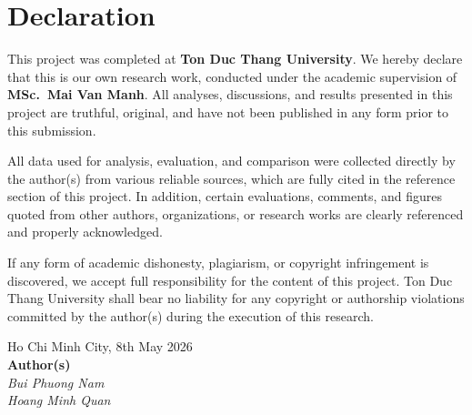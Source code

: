 \chapter*{Declaration}


This project was completed at \textbf{Ton Duc Thang University}.  
We hereby declare that this is our own research work, conducted under the academic supervision of \textbf{MSc.~Mai Van Manh}.  
All analyses, discussions, and results presented in this project are truthful, original, and have not been published in any form prior to this submission.

All data used for analysis, evaluation, and comparison were collected directly by the author(s) from various reliable sources, which are fully cited in the reference section of this project. In addition, certain evaluations, comments, and figures quoted from other authors, organizations, or research works are clearly referenced and properly acknowledged.

If any form of academic dishonesty, plagiarism, or copyright infringement is discovered, we accept full responsibility for the content of this project. Ton Duc Thang University shall bear no liability for any copyright or authorship violations committed by the author(s) during the execution of this research.

\vspace{3em}

\begin{flushright}
    Ho Chi Minh City,  8th May 2026 \\[4em]
    \textbf{Author(s)}\\[1em]
    \textit{Bui Phuong Nam} \\
    \textit{Hoang Minh Quan}
\end{flushright}
